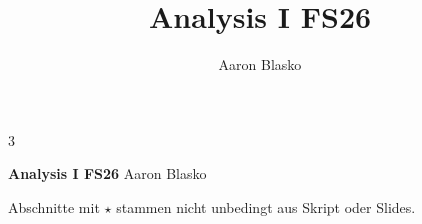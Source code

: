 \documentclass[8pt, a4paper]{extarticle}
\title{Analysis I FS26}
\author{Aaron Blasko}
\date{}
\numberwithin{equation}{section}
\begin{document}
\begin{multicols*}{3}

    {\large \textbf{Analysis I FS26}}
    Aaron Blasko

    Abschnitte mit $\star$ stammen nicht unbedingt aus Skript oder Slides.

    
    
    

\end{multicols*}

\pagebreak

\clearpage
\end{document}
